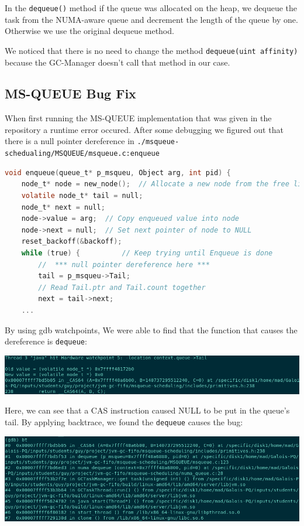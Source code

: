 \documentclass{article}
\begin{document}
 In the \lstinline{dequeue()} method if the queue was allocated on the heap, we dequeue the task from the NUMA-aware queue and decrement the length of the queue by one. Otherwise we use the original dequeue method.

 We noticed that there is no need to change the method \lstinline{dequeue(uint affinity)} because the GC-Manager doesn't call that method in our case.

 \subsection{MS-QUEUE Bug Fix}

 When first running the MS-QUEUE implementation that was given in the repository a runtime error occured. After some debugging we figured out that there is a null pointer dereference in \texttt{./msqueue-schedualing/MSQUEUE/msqueue.c:enqueue}

 \begin{lstlisting}[language=C]
 void enqueue(queue_t* p_msqueu, Object arg, int pid) {
	node_t* node = new_node();	// Allocate a new node from the free list
	volatile node_t* tail = null;
	node_t* next = null;
	node->value = arg;	// Copy enqueued value into node
	node->next = null;	// Set next pointer of node to NULL
	reset_backoff(&backoff);
	while (true) {			// Keep trying until Enqueue is done
		//  *** null pointer dereference here ***
		tail = p_msqueu->Tail; 
		// Read Tail.ptr and Tail.count together
		next = tail->next;	
	...
 \end{lstlisting}

By using gdb watchpoints, We were able to find that the function that causes the dereference is \texttt{dequeue}:

\includegraphics[width=\textwidth]{watchpoint.png}

Here, we can see that a CAS instruction caused NULL to be put in the queue's tail.
By applying backtrace, we found the \texttt{dequeue} causes the bug:

\includegraphics[width=\textwidth]{bt.png}
\end{document}
